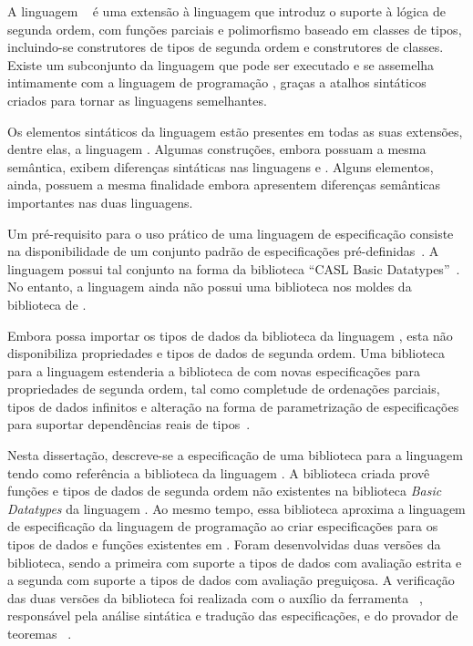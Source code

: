 A linguagem \HasCASL~\cite{SchroderMossakowski08} é uma extensão à linguagem \CASL que introduz o suporte à lógica de segunda ordem, com funções parciais e polimorfismo baseado em classes de tipos, incluindo-se construtores de tipos de segunda ordem e construtores de classes.
Existe um subconjunto da linguagem que pode ser executado e se assemelha intimamente com a linguagem de programação \Haskell, graças a atalhos sintáticos criados para tornar as linguagens semelhantes.

Os elementos sintáticos da linguagem \CASL estão presentes em todas as suas extensões, dentre elas, a linguagem \HasCASL.
Algumas construções, embora possuam a mesma semântica, exibem diferenças sintáticas nas linguagens \CASL e \HasCASL.
Alguns elementos, ainda, possuem a mesma finalidade embora apresentem diferenças semânticas importantes nas duas linguagens.

Um pré-requisito para o uso prático de uma linguagem de especificação consiste na disponibilidade de um conjunto padrão de especificações pré-definidas~\cite{Schroder2006}.
A linguagem \CASL possui tal conjunto na forma da biblioteca ``CASL Basic Datatypes''~\cite{Roggenbach:2004:CASL-Libraries}.
No entanto, a linguagem \HasCASL ainda não possui uma biblioteca nos moldes da biblioteca de \CASL.

Embora \HasCASL possa importar os tipos de dados da biblioteca da linguagem \CASL, esta não disponibiliza propriedades e tipos de dados de segunda ordem.
Uma biblioteca para a linguagem \HasCASL estenderia a biblioteca de \CASL com novas especificações para propriedades de segunda ordem, tal como completude de ordenações parciais, tipos de dados infinitos e alteração na forma de parametrização de especificações para suportar dependências reais de tipos~\cite{Schroder2006}.


Nesta dissertação, descreve-se a especificação de uma biblioteca para a linguagem \HasCASL tendo como referência a biblioteca \Prelude da linguagem \Haskell.
A biblioteca criada provê funções e tipos de dados de segunda ordem não existentes na biblioteca \textit{Basic Datatypes} da linguagem \CASL.
Ao mesmo tempo, essa biblioteca aproxima a linguagem de especificação \HasCASL da linguagem de programação \Haskell ao criar especificações para os tipos de dados e funções existentes em \Haskell.
Foram desenvolvidas duas versões da biblioteca, sendo a primeira com suporte a tipos de dados com avaliação estrita e a segunda com suporte a tipos de dados com avaliação preguiçosa.
A verificação das duas versões da biblioteca foi realizada com o auxílio da ferramenta \Hets~\cite{MossakowskiEtAl07b}, responsável pela análise sintática e tradução das especificações, e do provador de teoremas \Isabelle~\cite{Nipkow-Paulson-Wenzel:2002}.

